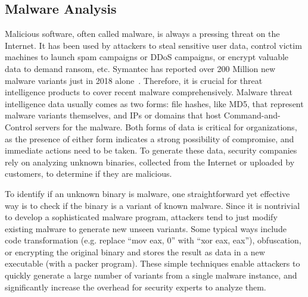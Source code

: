 \subsection{Malware Analysis}
Malicious software, often called malware, is always a pressing threat 
on the Internet. It has been used by attackers to steal sensitive user data, 
control victim machines to launch spam campaigns or DDoS campaigns, or 
encrypt valuable data to demand ransom, etc. Symantec has reported over 200 
Million new malware variants just in 2018 alone~\cite{symantecmalware}. 
Therefore, it is crucial for threat intelligence products to cover recent 
malware comprehensively.
Malware threat intelligence data usually comes as two forms: file hashes,
like MD5, that represent malware variants themselves, and IPs or domains
that host Command-and-Control servers for the malware. Both forms of 
data is critical for organizations, as the presence of either form 
indicates a strong possibility of compromise, and immediate actions need 
to be taken. To generate these data, security companies rely on analyzing 
unknown binaries, collected from the Internet or uploaded by customers,
to determine if they are malicious.

To identify if an unknown binary is malware, one straightforward yet
effective way is to check if the binary is a variant of known malware.
Since it is nontrivial to develop a sophisticated malware program, 
attackers tend to just modify existing malware to generate new unseen
variants. Some typical ways include code transformation (e.g. replace ``mov 
eax, 0'' with ``xor eax, eax''), obfuscation, or encrypting the original 
binary and stores the result as data in a new executable (with a packer 
program). These simple techniques enable attackers to quickly generate a 
large number of variants from a single malware instance, and significantly 
increase the overhead for security experts to analyze them.

